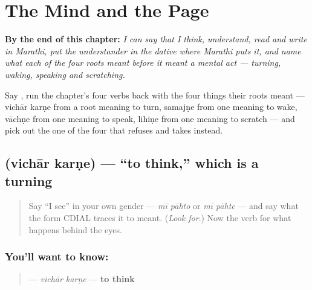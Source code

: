 
\chapter{The Mind and the Page}
\label{ch:mr-mind-and-page}

\begin{chapteropening}
\textbf{By the end of this chapter:} \emph{I can say that I think, understand, read and write in Marathi, put the understander in the dative where Marathi puts it, and name what each of the four roots meant before it meant a mental act — turning, waking, speaking and scratching.}

Say    , run the chapter's four verbs back with the four things their roots meant — vichār karṇe from a root meaning to turn, samajṇe from one meaning to wake, vāchṇe from one meaning to speak, lihiṇe from one meaning to scratch — and pick out the one of the four that refuses  and takes  instead.
\end{chapteropening}

\section[\texorpdfstring{\mr{विचार} \mr{करणे} (vichār karṇe)}{विचार करणे (vichār karṇe)}]{  (vichār karṇe) — \textquotedblleft{}to think,\textquotedblright{} which is a turning}

\label{lesson:MR-C08-vichar-karne}



\begin{quote}
Say \textquotedblleft{}I see\textquotedblright{} in your own gender — \emph{mī pāhto} or \emph{mī pāhte} — and say what the form CDIAL traces it to meant. (\emph{Look for}.) Now the verb for what happens behind the eyes.
\end{quote}

\subsection*{You'll want to know:  }
\begin{quote}
\textbf{ } — \emph{vichār karṇe} — \textbf{to think}
\end{quote}

